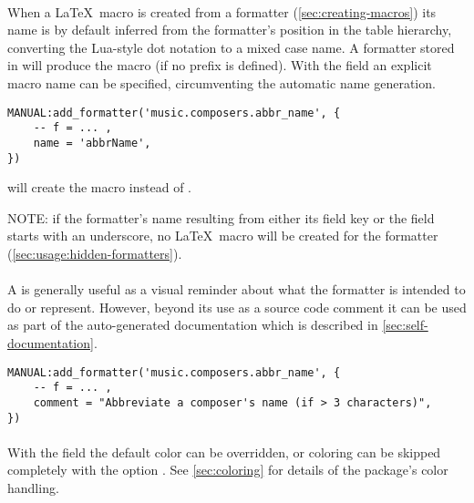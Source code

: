 \documentclass[12pt]{scrartcl}
\begin{document}
\paragraph{}

When a \LaTeX\ macro is created from a formatter (\vref{sec:creating-macros}) its name is by default inferred from the
formatter's position in the table hierarchy, converting the Lua-style dot
notation to a mixed case name.  A formatter stored in 
will produce the macro  (if no prefix is defined).  With the
 field an explicit macro name can be specified, circumventing the
automatic name generation.

\begin{verbatim}
MANUAL:add_formatter('music.composers.abbr_name', {
	-- f = ... ,
	name = 'abbrName',
})
\end{verbatim}

\noindent will create the macro  instead of .

NOTE: if the formatter's name resulting from either its field key or the
 field starts with an underscore, no \LaTeX\ macro will be created
for the formatter (\vref{sec:usage:hidden-formatters}).


\paragraph{}

A  is generally useful as a visual reminder about what the
formatter is intended to do or represent.  However, beyond its use as a source
code comment it can be used as part of the auto-generated documentation which is
described in \vref{sec:self-documentation}.

\begin{verbatim}
MANUAL:add_formatter('music.composers.abbr_name', {
	-- f = ... ,
	comment = "Abbreviate a composer's name (if > 3 characters)",
})
\end{verbatim}


\paragraph{}

With the  field the default color can be overridden, or coloring
can be skipped completely with the option .  See
\vref{sec:coloring} for details of the package's color handling.
\end{document}
